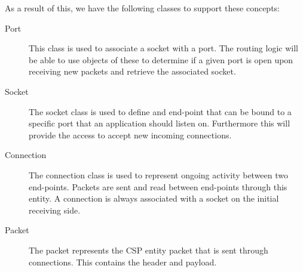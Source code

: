 As a result of this, we have the following classes to support these concepts:
\begin{description}
	\item[Port] This class is used to associate a socket with a port. The routing logic will be able to use objects of these to determine if a given port is open upon receiving new packets and retrieve the associated socket.
	\item[Socket] The socket class is used to define and end-point that can be bound to a specific port that an application should listen on. Furthermore this will provide the access to accept new incoming connections.
	\item[Connection] The connection class is used to represent ongoing activity between two end-points. Packets are sent and read between end-points through this entity. A connection is always associated with a socket on the initial receiving side.
	\item[Packet] The packet represents the CSP entity packet that is sent through connections. This contains the header and payload.
\end{description}
